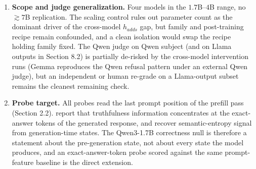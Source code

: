 \begin{enumerate}
\item
  \textbf{Scope and judge generalization.} Four models in the \(1.7\)B--\(4\)B range, no \(\gtrsim 7\)B replication. The scaling control rules out parameter count as the dominant driver of the cross-model \(h_{adds}\) gap, but family and post-training recipe remain confounded, and a clean isolation would swap the recipe holding family fixed. The Qwen judge on Qwen subject (and on Llama outputs in
  Section 8.2) is partially de-risked by the cross-model intervention
  runs (Gemma reproduces the Qwen refusal pattern under an external Qwen
  judge), but an independent or human re-grade on a Llama-output subset
  remains the cleanest remaining check.
\item
  \textbf{Probe target.} All probes read the last prompt position of the prefill pass (Section 2.2). \citet{orgad2024show} report that truthfulness information concentrates at the exact-answer tokens of the generated response, and \citet{kossen2024semantic} recover semantic-entropy signal from generation-time states. The Qwen3-1.7B correctness null is therefore a statement about the pre-generation state, not about every state the model produces, and an exact-answer-token probe scored against the same prompt-feature baseline is the direct extension.
\end{enumerate}

